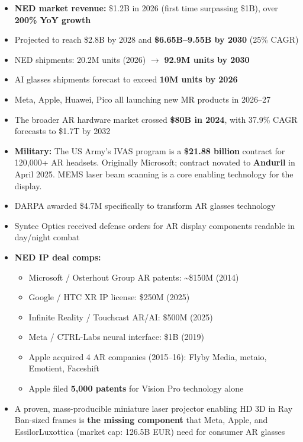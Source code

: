 \documentclass[11pt,letterpaper]{article}
\begin{document}
\begin{itemize}
\item \textbf{NED market revenue:} \$1.2B in 2026 (first time surpassing \$1B), over \textbf{200\% YoY growth}
\item Projected to reach \$2.8B by 2028 and \textbf{\$6.65B--9.55B by 2030} (25\% CAGR)
\item NED shipments: 20.2M units (2026) $\rightarrow$ \textbf{92.9M units by 2030}
\item AI glasses shipments forecast to exceed \textbf{10M units by 2026}
\item Meta, Apple, Huawei, Pico all launching new MR products in 2026--27
\item The broader AR hardware market crossed \textbf{\$80B in 2024}, with 37.9\% CAGR forecasts to \$1.7T by 2032

\item \textbf{Military:} The US Army's IVAS program is a \textbf{\$21.88 billion} contract for 120,000+ AR headsets. Originally Microsoft; contract novated to \textbf{Anduril} in April 2025. MEMS laser beam scanning is a core enabling technology for the display.
\item DARPA awarded \$4.7M specifically to transform AR glasses technology
\item Syntec Optics received defense orders for AR display components readable in day/night combat

\item \textbf{NED IP deal comps:}
\begin{itemize}
\item Microsoft / Osterhout Group AR patents: \textasciitilde\$150M (2014)
\item Google / HTC XR IP license: \$250M (2025)
\item Infinite Reality / Touchcast AR/AI: \$500M (2025)
\item Meta / CTRL-Labs neural interface: \$1B (2019)
\item Apple acquired 4 AR companies (2015--16): Flyby Media, metaio, Emotient, Faceshift
\item Apple filed \textbf{5,000 patents} for Vision Pro technology alone
\end{itemize}

\item A proven, mass-producible miniature laser projector enabling HD 3D in Ray Ban-sized frames is \textbf{the missing component} that Meta, Apple, and EssilorLuxottica (market cap: 126.5B EUR) need for consumer AR glasses
\end{itemize}
\end{document}
